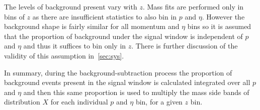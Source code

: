 The levels of background present vary with $z$. Mass fits are performed only in bins of $z$ as there are insufficient statistics to also bin in $p$ and $\eta$. However the background shape is fairly similar for all momentum and $\eta$ bins so it is assumed that the proportion of background under the signal window is independent of $p$ and $\eta$ and thus it suffices to bin only in $z$. There is further discussion of the validity of this assumption in~\autoref{sec:sys}.

In summary, during the background-subtraction process the proportion of background events present in the signal window is calculated integrated over all $p$ and $\eta$ and then this same proportion is used to multiply the mass side bands of distribution $X$ for each individual $p$ and $\eta$ bin, for a given $z$ bin.

 


